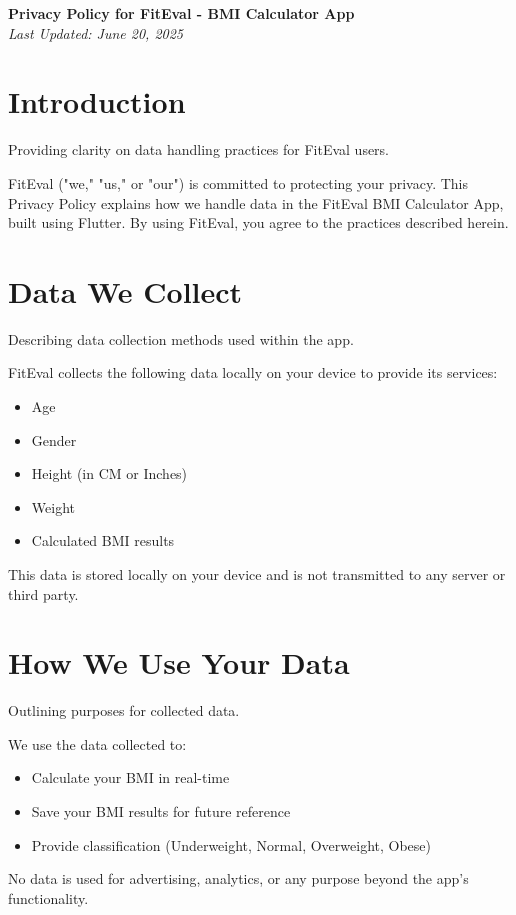 \documentclass[a4paper,12pt]{article}
\begin{document}
\begin{center}
    \textbf{\Large Privacy Policy for FitEval - BMI Calculator App} \\
    \vspace{0.5cm}
    \textit{Last Updated: June 20, 2025} \\
    \vspace{0.5cm}
\end{center}

\section*{Introduction}
Providing clarity on data handling practices for FitEval users.

FitEval ("we," "us," or "our") is committed to protecting your privacy. This Privacy Policy explains how we handle data in the FitEval BMI Calculator App, built using Flutter. By using FitEval, you agree to the practices described herein.

\section*{Data We Collect}
Describing data collection methods used within the app.

FitEval collects the following data locally on your device to provide its services:
\begin{itemize}
    \item Age
    \item Gender
    \item Height (in CM or Inches)
    \item Weight
    \item Calculated BMI results
\end{itemize}
This data is stored locally on your device and is not transmitted to any server or third party.

\section*{How We Use Your Data}
Outlining purposes for collected data.

We use the data collected to:
\begin{itemize}
    \item Calculate your BMI in real-time
    \item Save your BMI results for future reference
    \item Provide classification (Underweight, Normal, Overweight, Obese)
\end{itemize}
No data is used for advertising, analytics, or any purpose beyond the app's functionality.
\end{document}
